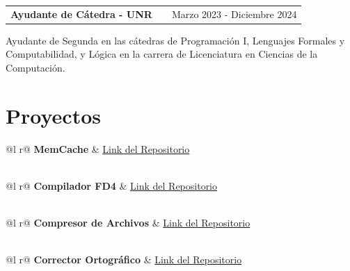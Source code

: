 \documentclass[a4paper,12pt]{article}
\makeatletter
\newenvironment{jobshort}[2]
    {
    \begin{tabularx}{\linewidth}{@{}l X r@{}}
    \textbf{#1} & \hfill & #2 \\[3.75pt]
    \end{tabularx}
    }
    {}
\makeatother
\begin{document}
\vspace{5pt}

\begin{jobshort}{Ayudante de Cátedra - UNR}{Marzo 2023 - Diciembre 2024}
Ayudante de Segunda en las cátedras de Programación I, Lenguajes Formales y Computabilidad, y Lógica en la carrera de Licenciatura en Ciencias de la Computación.
\end{jobshort}

\section{Proyectos}

\begin{tabularx}{\linewidth}{ @{}l r@{} }
\textbf{MemCache} & \hfill \href{https://github.com/AgusM01/MiniMemcached}{Link del Repositorio} \\[3.75pt]
  \\
\end{tabularx}

\begin{tabularx}{\linewidth}{ @{}l r@{} }
\textbf{Compilador FD4} & \hfill \href{https://github.com/llascola/FD4-compiler}{Link del Repositorio} \\[3.75pt]
  \\
\end{tabularx}

\begin{tabularx}{\linewidth}{ @{}l r@{} }
\textbf{Compresor de Archivos} & \hfill \href{https://github.com/llascola/compresor-huffmancode}{Link del Repositorio} \\[3.75pt]
  \\
\end{tabularx}

\begin{tabularx}{\linewidth}{ @{}l r@{} }
\textbf{Corrector Ortográfico} & \hfill \href{https://github.com/llascola/spell-checker}{Link del Repositorio} \\[3.75pt]
  \\
\end{tabularx}
\end{document}
